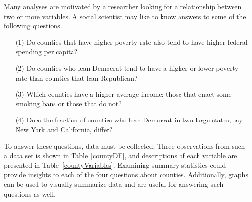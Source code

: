Many analyses are motivated by a researcher looking for a relationship between two or more variables. A social scientist may like to know answers to some of the following questions.
\begin{enumerate}
\setlength{\itemsep}{0mm}
\item[(1)]\label{countyPovertyIncomeQuestion} Do counties that have higher poverty rate also tend to have higher federal spending per capita?
\item[(2)]\label{possibleCausationQuestionForAffiliation} Do counties who lean Democrat tend to have a higher or lower poverty rate than counties that lean Republican?
\item[(3)]\label{isAverageIncomeAssociatedWithSmokingBans} Which counties have a higher average income: those that enact some smoking bans or those that do not?
\item[(4)]\label{doesTheProportionOfMalesDifferBasedOnLocation} Does the fraction of counties who lean Democrat in two large states, say New York and California, differ?
\end{enumerate}

To answer these questions, data must be collected. Three observations from such a data set is shown in Table~\ref{countyDF}, and descriptions of each variable are presented in Table~\ref{countyVariables}. 
Examining summary statistics could provide insights to each of the four questions about counties. Additionally, graphs can be used to visually summarize data and are useful for answering such questions as well.


